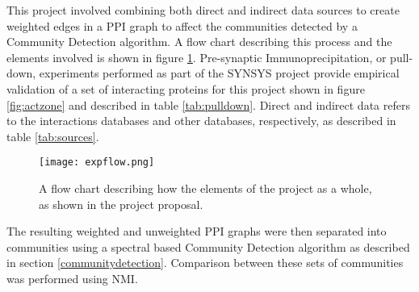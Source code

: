 This project involved combining both direct and indirect data sources to create weighted edges in a \ac{PPI} graph to affect the communities detected by a Community Detection algorithm.
A flow chart describing this process and the elements involved is shown in figure \ref{fig:expflow}.
Pre-synaptic Immunoprecipitation, or pull-down, experiments performed as part of the SYNSYS project\autocite{synsys} provide empirical validation of a set of interacting proteins for this project shown in figure \ref{fig:actzone} and described in table \ref{tab:pulldown}.
Direct and indirect data refers to the interactions databases and other databases, respectively, as described in table \ref{tab:sources}.


\begin{figure}
    \centering
    \texttt{[image: expflow.png]}
    \caption{A flow chart describing how the elements of the project as a whole, as shown in the project proposal.}
    \label{fig:expflow}
\end{figure}

The resulting weighted and unweighted \ac{PPI} graphs were then separated into communities using a spectral based Community Detection algorithm as described in section \ref{communitydetection}.
Comparison between these sets of communities was performed using \ac{NMI}\autocite{lancichinetti_benchmark_2008}.

